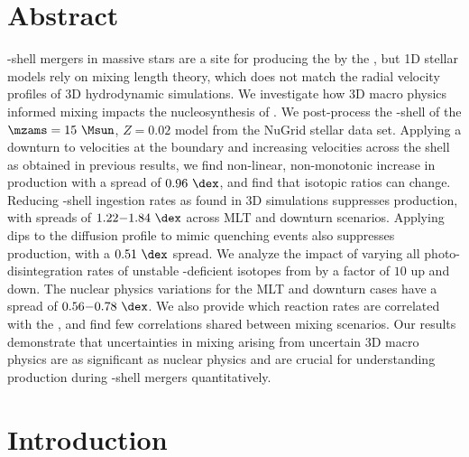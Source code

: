 \section{Abstract}
\oxygen[]-\carbon[] shell mergers in massive stars are a site for producing the \pnucn{} by the \gprn{}, but 1D stellar models rely on mixing length theory, which does not match the radial velocity profiles of 3D hydrodynamic simulations.
We investigate how 3D macro physics informed mixing impacts the nucleosynthesis of \pnucn{}.
We post-process the \oxygen[]-shell of the $\mzams=15~\Msun$, $Z=0.02$ model from the NuGrid stellar data set.
Applying a downturn to velocities at the boundary and increasing velocities across the shell as obtained in previous results, we find non-linear, non-monotonic increase in \pnuc{} production with a spread of $0.96~\dex$, and find that isotopic ratios can change. 
Reducing \carbon[]-shell ingestion rates as found in 3D simulations suppresses production, with spreads of $1.22{-}1.84~\dex$ across MLT and downturn scenarios. 
Applying dips to the diffusion profile to mimic quenching events also suppresses production, with a $0.51~\dex$ spread. 
We analyze the impact of varying all photo-disintegration rates of unstable \nt-deficient isotopes from \selenium[]{--}\polonium[] by a factor of $10$ up and down.
The nuclear physics variations for the MLT and downturn cases have a spread of $0.56{-}0.78~\dex$.
We also provide which reaction rates are correlated with the \pnucn{}, and find few correlations shared between mixing scenarios.
Our results demonstrate that uncertainties in mixing arising from uncertain 3D macro physics are as significant as nuclear physics and are crucial for understanding \pnuc{} production during \oxygen[]-\carbon[] shell mergers quantitatively. 

\section{Introduction} \label{sec:intro}

